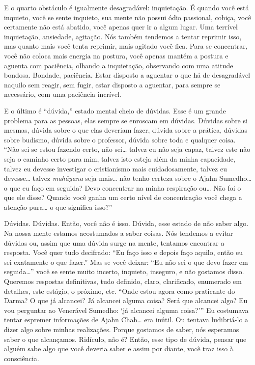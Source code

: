 E o quarto obstáculo é igualmente desagradável: inquietação. É
quando você está inquieto, você se sente inquieto, sua mente não possui
ódio passional, cobiça, você certamente não está abatido, você apenas
quer ir a algum lugar. Uma terrível inquietação, ansiedade, agitação.
Nós também tendemos a tentar reprimir isso, mas quanto mais você tenta
reprimir, mais agitado você fica. Para se concentrar, você não coloca
mais energia na postura, você apenas mantém a postura e aguenta com
paciência, olhando a inquietação, observando com uma atitude bondosa.
Bondade, paciência. Estar disposto a aguentar o que há de desagradável
naquilo sem reagir, sem fugir, estar disposto a aguentar, para sempre
se necessário, com uma paciência incrível.

E o último é “dúvida,” estado mental cheio de dúvidas. Esse é um
grande problema para as pessoas, elas sempre se enroscam em dúvidas.
Dúvidas sobre si mesmas, dúvida sobre o que elas deveriam fazer, dúvida
sobre a prática, dúvidas sobre budismo, dúvida sobre o professor,
dúvida sobre toda e qualquer coisa. “Não sei se estou fazendo certo,
não sei… talvez eu não seja capaz, talvez este não seja o caminho certo
para mim, talvez isto esteja além da minha capacidade, talvez eu
devesse investigar o cristianismo mais cuidadosamente, talvez eu
devesse… talvez \textit{mahāyana} seja mais… não tenho certeza sobre
o Ajahn Sumedho… o que eu faço em seguida? Devo concentrar na minha
respiração ou… Não foi o que ele disse? Quando você ganha um certo
nível de concentração você chega a atenção pura… o que significa isso?”

Dúvidas. Dúvidas. Então, você não é isso. Dúvida, esse estado de não
saber algo. Na nossa mente estamos acostumados a saber coisas. Nós
tendemos a evitar dúvidas ou, assim que uma dúvida surge na mente,
tentamos encontrar a resposta. Você quer tudo decifrado: “Eu faço isso
e depois faço aquilo, então eu sei exatamente o que fazer.” Mas se você
deixar: “Eu não sei o que devo fazer em seguida…” você se sente muito
incerto, inquieto, inseguro, e não gostamos disso. Queremos respostas
definitivas, tudo definido, claro, clarificado, enumerado em detalhes,
este estágio, o próximo, etc. “Onde estou agora como praticante do
Darma? O que já alcancei? Já alcancei alguma coisa? Será que alcancei
algo? Eu vou perguntar ao Venerável Sumedho: ‘já alcancei alguma
coisa?’” Eu costumava tentar espremer informações de Ajahn Chah… era
inútil. Ou tentava ludibriá-lo a dizer algo sobre minhas realizações.
Porque gostamos de saber, nós esperamos saber o que alcançamos.
Ridículo, não é? Então, esse tipo de dúvida, pensar que alguém sabe
algo que você deveria saber e assim por diante, você traz isso à
consciência. 

